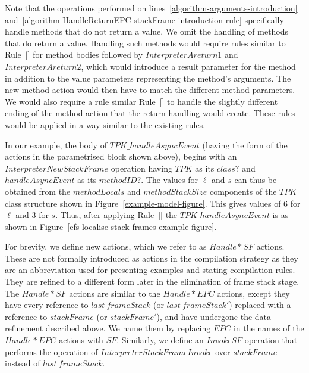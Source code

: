 Note that the operations performed on
lines~\ref{algorithm-arguments-introduction}
and~\ref{algorithm-HandleReturnEPC-stackFrame-introduction-rule}
specifically handle methods that do not return a value.
We omit the handling of methods that do return a value. 
Handling such methods would require rules similar to
Rule~[] for method bodies
followed by $InterpreterAreturn1$ and $InterpreterAreturn2$, which
would introduce a result parameter for the method in addition to the
value parameters representing the method's arguments.
The new method action would then have to match the different method
parameters.
We would also require a rule similar
Rule~[] to
handle the slightly different ending of the method action that the
return handling would create.
These rules would be applied in a way similar to the existing rules.

In our example, the body of $TPK\_handleAsyncEvent$ (having the form
of the actions in the parametrised block shown above), begins with an
$InterpreterNewStackFrame$ operation having $TPK$ as its $class?$ and
$handleAsyncEvent$ as its $methodID?$.
The values for $\ell$ and $s$ can thus be obtained from the
$methodLocals$ and $methodStackSize$ components of the $TPK$ class
structure shown in Figure~\ref{example-model-figure}.
This gives values of $6$ for $\ell$ and $3$ for $s$.
Thus, after applying
Rule~[] the
$TPK\_handleAsyncEvent$ is as shown in
Figure~\ref{efs-localise-stack-frames-example-figure}.

For brevity, we define new actions, which we refer to as $Handle*SF$
actions.
These are not formally introduced as actions in the compilation
strategy as they are an abbreviation used for presenting examples and
stating compilation rules.
They are refined to a different form later in the elimination of frame
stack stage.
The $Handle*SF$ actions are similar to the $Handle*EPC$ actions,
except they have every reference to $last~frameStack$ (or
$last~frameStack'$) replaced with a reference to $stackFrame$ (or
$stackFrame'$), and have undergone the data refinement described
above.
We name them by replacing $EPC$ in the names of the $Handle*EPC$
actions with $SF$.
Similarly, we define an $InvokeSF$ operation that performs the
operation of $InterpreterStackFrameInvoke$ over $stackFrame$ instead
of $last~frameStack$.

